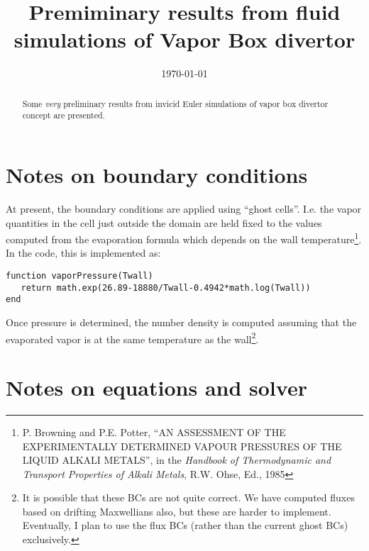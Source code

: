 \documentclass{tufte-handout}
\title{Premiminary results from fluid simulations of Vapor Box divertor}
\date{\today}%
\begin{document}
\maketitle

\begin{abstract}
  \noindent Some \emph{very} preliminary results from invicid Euler
  simulations of vapor box divertor concept are presented.
\end{abstract}

\section{Notes on boundary conditions}

At present, the boundary conditions are applied using ``ghost
cells''. I.e. the vapor quantities in the cell just outside the domain
are held fixed to the values computed from the evaporation formula
which depends on the wall temperature\footnote{P. Browning and
  P.E. Potter, ``AN ASSESSMENT OF THE EXPERIMENTALLY DETERMINED VAPOUR
  PRESSURES OF THE LIQUID ALKALI METALS'', in the \emph{Handbook of
    Thermodynamic and Transport Properties of Alkali Metals},
  R.W. Ohse, Ed., 1985}. In the code, this is implemented as:
\begin{verbatim}
function vaporPressure(Twall)
   return math.exp(26.89-18880/Twall-0.4942*math.log(Twall))
end
\end{verbatim}
Once pressure is determined, the number density is computed assuming
that the evaporated vapor is at the same temperature as the
wall\footnote{It is possible that these BCs are not quite correct. We
  have computed fluxes based on drifting Maxwellians also, but these
  are harder to implement. Eventually, I plan to use the flux BCs
  (rather than the current ghost BCs) exclusively.}.

\section{Notes on equations and solver}
\end{document}
